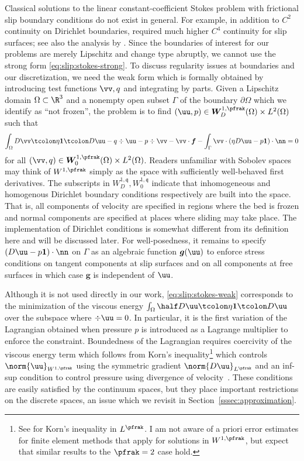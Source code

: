 Classical solutions to the linear constant-coefficient Stokes problem with frictional slip boundary conditions do not exist in general.
For example, in addition to $C^2$ continuity on Dirichlet boundaries, \citet{saito2004stokes} required much higher $C^4$ continuity for slip surfaces; see also the analysis by \citet{fujita2002coherent}.
Since the boundaries of interest for our problems are merely Lipschitz and change type abruptly, we cannot use the strong form \eqref{eq:slip:stokes-strong}.
To discuss regularity issues at boundaries and our discretization, we need the weak form which is formally obtained by introducing test functions $\vv,q$ and integrating by parts.
Given a Lipschitz domain $\Omega \subset \R^3$ and a nonempty open subset $\Gamma$ of the boundary $\partial\Omega$ which we identify as ``not frozen'', the problem is to find $(\uu,p) \in \bm W_D^{1,\pfrak}(\Omega) \times L^2(\Omega)$ such that
\begin{equation}\label{eq:slip:stokes-weak}
  \int_\Omega D\vv\tcolon \eta\bm 1 \tcolon D\uu - q\div\uu - p\div\vv - \vv\cdot\bm f
  - \int_\Gamma \vv\cdot (\eta D\uu - p\bm 1)\cdot\nn = 0
\end{equation}
for all $(\vv,q)\in \bm W_0^{1,\pfrak}(\Omega) \times L^2(\Omega)$.
Readers unfamiliar with Sobolev spaces may think of $W^{1,\pfrak}$ simply as the space with sufficiently well-behaved first derivatives.
The subscripts in $W_D^{1,\mathfrak{q}},W_0^{1,\mathfrak{q}}$ indicate that inhomogeneous and homogenous Dirichlet boundary conditions respectively are built into the space.
That is, all components of velocity are specified in regions where the bed is frozen and normal components are specified at places where sliding may take place.
The implementation of Dirichlet conditions is somewhat different from its definition here and will be discussed later.
For well-posedness, it remains to specify $(D\uu - p\bm 1)\cdot\nn$ on $\Gamma$ as an algebraic function $\bm g(\uu)$ to enforce stress conditions on tangent components at slip surfaces and on all components at free surfaces in which case $\bm g$ is independent of $\uu$.

Although it is not used directly in our work, \eqref{eq:slip:stokes-weak} corresponds to the minimization of the viscous energy $\int_\Omega \half D\uu\tcolon \eta\bm 1 \tcolon D\uu$ over the subspace where $\div\uu = 0$.
In particular, it is the first variation of the Lagrangian obtained when pressure $p$ is introduced as a Lagrange multiplier to enforce the constraint.
Boundedness of the Lagrangian requires coercivity of the viscous energy term which follows from Korn's inequality\footnote{%
See \citet{kondratev1988boundary} for Korn's inequality in $L^\pfrak$.
I am not aware of a priori error estimates for finite element methods that apply for solutions in $W^{1,\pfrak}$, but expect that similar results to the $\pfrak=2$ case hold.}
which controls $\norm{\uu}_{W^{1,\pfrak}}$ using the symmetric gradient $\norm{D\uu}_{L^\pfrak}$ and an inf-sup condition to control pressure using divergence of velocity~\citep{evans1998partial,brenner2008mathematical}.
These conditions are easily satisfied by the continuum spaces, but they place important restrictions on the discrete spaces, an issue which we revisit in Section~\ref{sssec:approximation}.

